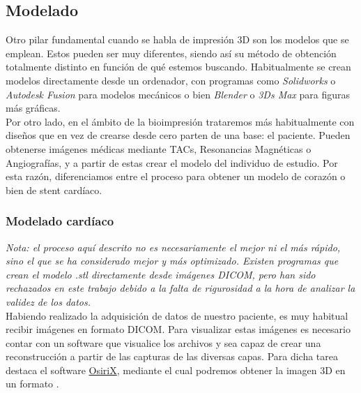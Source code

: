 \documentclass[a4paper,12pt]{article}
\begin{document}


\FloatBarrier
\subsection{Modelado}
Otro pilar fundamental cuando se habla de impresión 3D son los modelos que se emplean. Estos pueden ser muy diferentes, siendo así su método de obtención totalmente distinto en función de qué estemos buscando. Habitualmente se crean modelos directamente desde un ordenador, con programas como \emph{Solidworks} o \emph{Autodesk Fusion} para modelos mecánicos o bien \emph{Blender} o \emph{3Ds Max} para figuras más gráficas.\\

Por otro lado, en el ámbito de la bioimpresión trataremos más habitualmente con diseños que en vez de crearse desde cero parten de una base: el paciente. Pueden obtenerse imágenes médicas mediante TACs, Resonancias Magnéticas o Angiografías, y a partir de estas crear el modelo del individuo de estudio. Por esta razón, diferenciamos entre el proceso para obtener un modelo de corazón o bien de stent cardíaco.\\

\subsubsection{Modelado cardíaco}
\emph{Nota: el proceso aquí descrito no es necesariamente el mejor ni el más rápido, sino el que se ha considerado mejor y más optimizado. Existen programas que crean el modelo .stl directamente desde imágenes DICOM, pero han sido rechazados en este trabajo debido a la falta de rigurosidad a la hora de analizar la validez de los datos.}\\

Habiendo realizado la adquisición de datos de nuestro paciente, es muy habitual recibir imágenes en formato DICOM. Para visualizar estas imágenes es necesario contar con un software que visualice los archivos y sea capaz de crear una reconstrucción a partir de las capturas de las diversas capas. Para dicha tarea destaca el software \href{http://www.osirix-viewer.com/}{OsiriX}, mediante el cual podremos obtener la imagen 3D en un formato .\\
\end{document}
